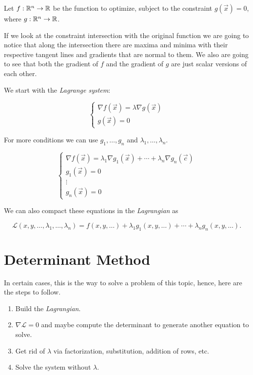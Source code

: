 Let \( f : \mathbb{R}^n \to \mathbb{R} \) be the function to optimize, subject to the constraint 
\( g(\vec{x}) = 0 \), where \( g : \mathbb{R}^n \to \mathbb{R} \).  

If we look at the constraint intersection with the original function we are going to notice that along 
the intersection there are maxima and minima with their respective tangent lines and gradients that are 
normal to them. We also are going to see that both the gradient of \(f\) and the gradient of \(g\) are just scalar versions of each other. 

We start with the \emph{Lagrange system}:

\[
    \begin{cases}
        \nabla f(\vec{x}) = \lambda \nabla g(\vec{x}) \\
        g(\vec{x}) = 0
    \end{cases}
\]

For more conditions  we can use \(g_1, \dots, g_n\) and \(\lambda_1, \dots, \lambda_n\).

\[
    \begin{cases}
        \nabla f(\vec{x}) = \lambda_1 \nabla g_1(\vec{x}) + \cdots + \lambda_n \nabla g_n(\vec{c}) \\
        g_1(\vec{x}) = 0 \\
        \vdots \\
        g_n(\vec{x}) = 0
    \end{cases}
\]

We can also compact these equations in the \emph{Lagrangian} as

\[
    \mathcal{L}(x,y, \dots, \lambda_1, \dots, \lambda_n) = f(x, y, \dots) + \lambda_1 g_1(x, y, \dots) + 
    \cdots + \lambda_n g_n(x, y, \dots).
\]

\section{Determinant Method}

In certain cases, this is the way to solve a problem of this topic, hence, here are the steps to follow.

\begin{enumerate}
    
    \item Build the \emph{Lagrangian}.
    
    \item \(\nabla \mathcal{L} = 0\) and maybe compute the determinant to generate another equation to solve.
        
    \item Get rid of \(\lambda\) via factorization, substitution, addition of rows, etc.
    
    \item Solve the system without \(\lambda\).

\end{enumerate}

